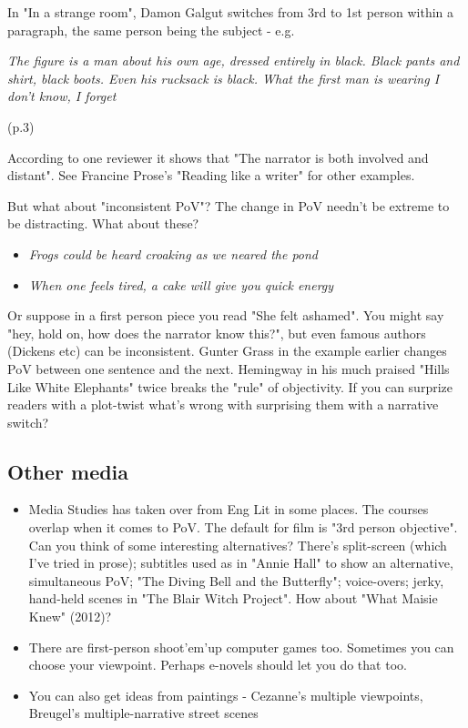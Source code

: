 \documentclass[11pt]{article}
\newenvironment{narrow}[2]{%
 \begin{list}{}{%
  \setlength{\topsep}{0pt}%
  \setlength{\leftmargin}{#1}%
  \setlength{\rightmargin}{#2}%
  \setlength{\listparindent}{\parindent}%
  \setlength{\itemindent}{\parindent}%
  \setlength{\parsep}{\parskip}%
 }%
\item[]}{\end{list}}
\begin{document}
In "In a strange room", Damon Galgut switches from 3rd to 1st person within a paragraph, the same person being the subject - e.g.

 \begin{narrow}{1.0cm}{1.0cm}
\textit{The figure is a man about his own age, dressed entirely in black. Black pants 
and shirt, black boots. Even his rucksack is black. What the first man is 
wearing I don't know, I forget}
\end{narrow}
(p.3)


According to one reviewer it shows that "The narrator is both involved and distant". See Francine Prose's "Reading like a writer" for other examples.



But what about "inconsistent PoV"? The change in PoV needn't be extreme to be distracting. What about these?


\begin{itemize}
\item \textit{Frogs could be heard croaking as we neared the pond}
\item \textit{When one feels tired, a cake will give you quick energy}
\end{itemize}
Or suppose in a first person piece you read "She felt ashamed". You might say "hey, hold on, how does the narrator know this?", but even famous authors (Dickens etc) can be inconsistent. Gunter Grass in the example earlier changes PoV between one sentence and the next. Hemingway in his much praised "Hills Like White Elephants" twice breaks the "rule" of objectivity. If you can surprize readers with a plot-twist what's wrong with surprising them with a narrative switch?





\subsection*{Other media}
\begin{itemize}
\item Media Studies has taken over from Eng Lit in some places. The courses overlap when it comes to PoV. The default for film is "3rd person objective". Can you think of some interesting alternatives? There's split-screen (which I've tried in prose); subtitles used as in "Annie Hall" to show an alternative, simultaneous PoV; "The Diving Bell and the Butterfly"; voice-overs; jerky, hand-held scenes in "The Blair Witch Project". How about "What Maisie Knew" (2012)?
\item There are first-person shoot'em'up computer games too. Sometimes you can choose your viewpoint. Perhaps e-novels should let you do that too.
\item You can also get ideas from paintings - Cezanne's multiple viewpoints, Breugel's multiple-narrative street scenes
\end{itemize}
\end{document}
